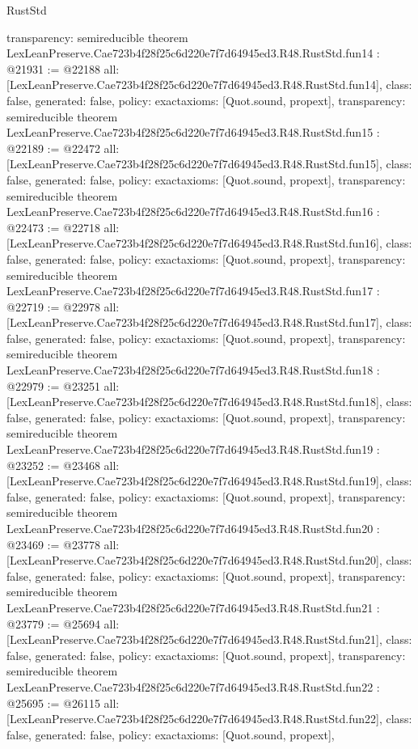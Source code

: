 \begin{lexlean}{RustStd}
\begin{coremodule}
{  transparency: semireducible
}
theorem LexLeanPreserve.Cae723b4f28f25c6d220e7f7d64945ed3.R48.RustStd.fun14 : @21931 := @22188 {
  all: [LexLeanPreserve.Cae723b4f28f25c6d220e7f7d64945ed3.R48.RustStd.fun14],
  class: false,
  generated: false,
  policy: exact{axioms: [Quot.sound, propext]},
  transparency: semireducible
}
theorem LexLeanPreserve.Cae723b4f28f25c6d220e7f7d64945ed3.R48.RustStd.fun15 : @22189 := @22472 {
  all: [LexLeanPreserve.Cae723b4f28f25c6d220e7f7d64945ed3.R48.RustStd.fun15],
  class: false,
  generated: false,
  policy: exact{axioms: [Quot.sound, propext]},
  transparency: semireducible
}
theorem LexLeanPreserve.Cae723b4f28f25c6d220e7f7d64945ed3.R48.RustStd.fun16 : @22473 := @22718 {
  all: [LexLeanPreserve.Cae723b4f28f25c6d220e7f7d64945ed3.R48.RustStd.fun16],
  class: false,
  generated: false,
  policy: exact{axioms: [Quot.sound, propext]},
  transparency: semireducible
}
theorem LexLeanPreserve.Cae723b4f28f25c6d220e7f7d64945ed3.R48.RustStd.fun17 : @22719 := @22978 {
  all: [LexLeanPreserve.Cae723b4f28f25c6d220e7f7d64945ed3.R48.RustStd.fun17],
  class: false,
  generated: false,
  policy: exact{axioms: [Quot.sound, propext]},
  transparency: semireducible
}
theorem LexLeanPreserve.Cae723b4f28f25c6d220e7f7d64945ed3.R48.RustStd.fun18 : @22979 := @23251 {
  all: [LexLeanPreserve.Cae723b4f28f25c6d220e7f7d64945ed3.R48.RustStd.fun18],
  class: false,
  generated: false,
  policy: exact{axioms: [Quot.sound, propext]},
  transparency: semireducible
}
theorem LexLeanPreserve.Cae723b4f28f25c6d220e7f7d64945ed3.R48.RustStd.fun19 : @23252 := @23468 {
  all: [LexLeanPreserve.Cae723b4f28f25c6d220e7f7d64945ed3.R48.RustStd.fun19],
  class: false,
  generated: false,
  policy: exact{axioms: [Quot.sound, propext]},
  transparency: semireducible
}
theorem LexLeanPreserve.Cae723b4f28f25c6d220e7f7d64945ed3.R48.RustStd.fun20 : @23469 := @23778 {
  all: [LexLeanPreserve.Cae723b4f28f25c6d220e7f7d64945ed3.R48.RustStd.fun20],
  class: false,
  generated: false,
  policy: exact{axioms: [Quot.sound, propext]},
  transparency: semireducible
}
theorem LexLeanPreserve.Cae723b4f28f25c6d220e7f7d64945ed3.R48.RustStd.fun21 : @23779 := @25694 {
  all: [LexLeanPreserve.Cae723b4f28f25c6d220e7f7d64945ed3.R48.RustStd.fun21],
  class: false,
  generated: false,
  policy: exact{axioms: [Quot.sound, propext]},
  transparency: semireducible
}
theorem LexLeanPreserve.Cae723b4f28f25c6d220e7f7d64945ed3.R48.RustStd.fun22 : @25695 := @26115 {
  all: [LexLeanPreserve.Cae723b4f28f25c6d220e7f7d64945ed3.R48.RustStd.fun22],
  class: false,
  generated: false,
  policy: exact{axioms: [Quot.sound, propext]},
}
\end{coremodule}
\end{lexlean}
